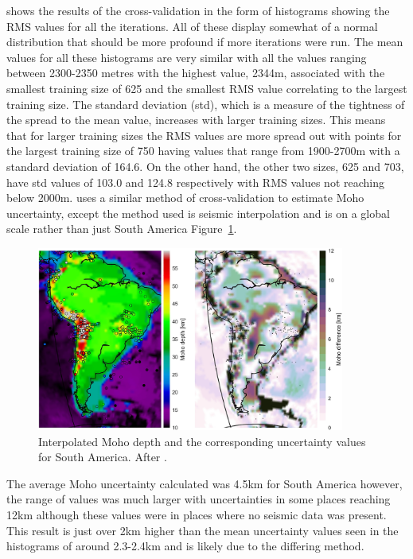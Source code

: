 shows the results of the cross-validation in the form of histograms showing the RMS values for all the iterations. All of these display somewhat of a normal distribution that should be more profound if more iterations were run. The mean values for all these histograms are very similar with all the values ranging between 2300-2350 metres with the highest value, 2344m, associated with the smallest training size of 625 and the smallest RMS value correlating to the largest training size. The standard deviation (std), which is a measure of the tightness of the spread to the mean value, increases with larger training sizes. This means that for larger training sizes the RMS values are more spread out with points for the largest training size of 750 having values that range from 1900-2700m with a standard deviation of 164.6. On the other hand, the other two sizes, 625 and 703, have std values of 103.0 and 124.8 respectively with RMS values not reaching below 2000m.
\cite{Szwillus2019} uses a similar method of cross-validation to estimate Moho uncertainty, except the method used is seismic interpolation and is on a global scale rather than just South America Figure~\ref{fig:uncertainty}.
\begin{figure}[h]
  \begin{center}
    \includegraphics[width=0.9\textwidth]{figures/Szwillus-uncertainty}
  \end{center}
  \caption{
   Interpolated Moho depth and the corresponding uncertainty values for South America. After \cite{Szwillus2019}.
  }
  \label{fig:uncertainty}
\end{figure}
The average Moho uncertainty calculated was 4.5km for South America however, the range of values was much larger with uncertainties in some places reaching 12km although these values were in places where no seismic data was present. This result is just over 2km higher than the mean uncertainty values seen in the histograms of around 2.3-2.4km and is likely due to the differing method.
